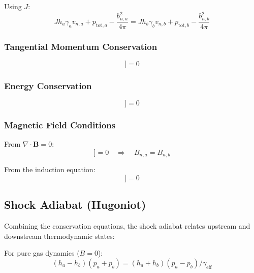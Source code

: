 \documentclass[12pt,a4paper]{article}
\begin{document}
Using $J$:
\begin{equation}
J h_a \gamma_a v_{n,a} + p_{\text{tot},a} - \frac{b_{n,a}^2}{4\pi}
= J h_b \gamma_b v_{n,b} + p_{\text{tot},b} - \frac{b_{n,b}^2}{4\pi}
\label{eq:RH_momentum_n_2}
\end{equation}

\subsubsection{Tangential Momentum Conservation}

\begin{equation}
[\![ \rho_0 h \gamma^2 (v - V_s) v_t - \frac{b_n b_t}{4\pi} ]\!] = 0
\label{eq:RH_momentum_t}
\end{equation}

\subsubsection{Energy Conservation}

\begin{equation}
[\![ (\rho_0 h \gamma^2 + b^2/4\pi)(v - V_s) - (b^0/4\pi)(b_n/\gamma) ]\!] = 0
\label{eq:RH_energy}
\end{equation}

\subsubsection{Magnetic Field Conditions}

From $\nabla \cdot \bm{B} = 0$:
\begin{equation}
[\![ B_n ]\!] = 0 \quad \Rightarrow \quad B_{n,a} = B_{n,b}
\label{eq:RH_divB}
\end{equation}

From the induction equation:
\begin{equation}
[\![ (v - V_s) B_t - v_t B_n ]\!] = 0
\label{eq:RH_induction}
\end{equation}

\subsection{Shock Adiabat (Hugoniot)}

Combining the conservation equations, the shock adiabat relates upstream and
downstream thermodynamic states:

For pure gas dynamics ($B = 0$):
\begin{equation}
(h_a - h_b)(p_a + p_b) = (h_a + h_b)(p_a - p_b)/\gamma_\text{eff}
\label{eq:hugoniot_hydro}
\end{equation}
\end{document}
